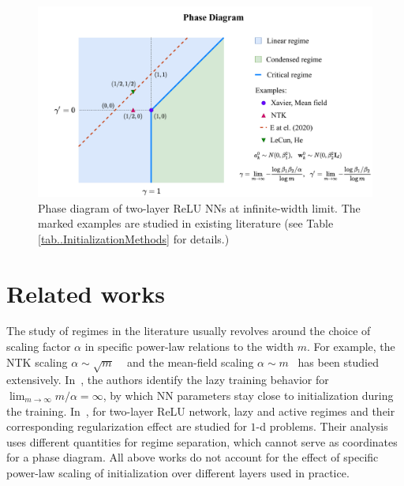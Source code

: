 \documentclass{article}
\begin{document}
\begin{figure}
    \centering
    \includegraphics[width=\textwidth]{pic/fig-phase-diagram}
    \caption{Phase diagram of two-layer ReLU NNs at infinite-width limit. The marked examples are studied in existing literature (see Table \ref{tab..InitializationMethods} for details.) }
    \label{fig:phase-diagram}
\end{figure}

\section{Related works}
The study of regimes in the literature usually revolves around the choice of scaling factor $\alpha$ in specific power-law relations to the width $m$. For example, the NTK scaling $\alpha\sim\sqrt{m}$ ~\cite{jacot_neural_2018,arora2019exact,zhang_type_2019} and the mean-field scaling $\alpha\sim m$~\cite{mei_mean_2018,rotskoff_parameters_2018,chizat_global_2018,sirignano_mean_2020} has been studied extensively. In~\cite{chizat2019lazy}, the authors identify the lazy training behavior for $\lim_{m\to \infty}m/\alpha =\infty$, by which NN parameters stay close to initialization during the training. In~\cite{williams_gradient_2019}, for two-layer ReLU network, lazy and active regimes and their corresponding regularization effect are studied for $1$-d problems. Their analysis uses different quantities for regime separation, which cannot serve as coordinates for a phase diagram. All above works do not account for the effect of specific power-law scaling of initialization over different layers used in practice.
\end{document}
